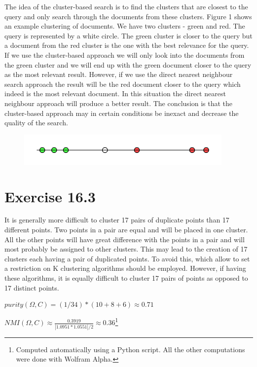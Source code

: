 \documentclass[a4paper, notitlepage]{article}
\begin{document}
The idea of the cluster-based search is to find the clusters that are closest to the query and only search through the documents from these clusters. Figure 1 shows an example clustering of documents. We have two clusters - green and red. The query is represented by a white circle. The green cluster is closer to the query but a document from the red cluster is the one with the best relevance for the query. If we use the cluster-based approach we will only look into the documents from the green cluster and we will end up with the green document closer to the query as the most relevant result. However, if we use the direct nearest neighbour search approach the result will be the red document closer to the query which indeed is the most relevant document. In this situation the direct nearest neighbour approach will produce a better result. The conclusion is that the cluster-based approach may in certain conditions be inexact and decrease the quality of the search.

\begin{figure}[H]
	\centering
	\includegraphics[]{Clustering.png}
	\caption{}
\end{figure}

\section{Exercise 16.3}

It is generally more difficult to cluster 17 pairs of duplicate points than 17 different points. Two points in a pair are equal and will be placed in one cluster. All the other points will have great difference with the points in a pair and will most probably be assigned to other clusters. This may lead to the creation of 17 clusters each having a pair of duplicated points. To avoid this, which allow to set a restriction on K clustering algorithms should be employed. However, if having these algorithms, it is equally difficult to cluster 17 pairs of points as opposed to 17 distinct points. \newline

\(purity(\Omega,C) = (1/34) * (10 + 8 + 6) \approx 0.71\) \newline

\(NMI(\Omega, C) \approx \frac{0.3919}{|1.0951 * 1.0551| / 2} \approx 0.36\)\footnote{Computed automatically using a Python script. All the other computations were done with Wolfram Alpha.} \newline
\end{document}

